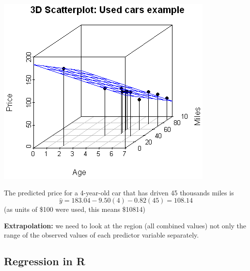 \documentclass[
]{article}
\begin{document}
\begin{center}\includegraphics[width=0.4\linewidth,height=0.4\textheight]{figures/3d2} \end{center}

The predicted price for a 4-year-old car that has driven 45 thousands
miles is \[\hat{y}=183.04-9.50 (4)- 0.82 (45)=108.14\] (as units of
\$100 were used, this means \$10814)

\textbf{Extrapolation:} we need to look at the region (all combined
values) not only the range of the observed values of each predictor
variable separately.

\hypertarget{regression-in-r-1}{%
\subsection{Regression in R}\label{regression-in-r-1}}
\end{document}
